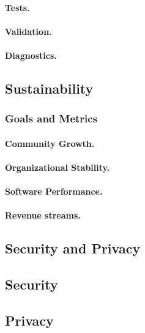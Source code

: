 \documentclass[11pt]{article}
\begin{document}
\paragraph{Tests.}
\paragraph{Validation.}
\paragraph{Diagnostics.}

\subsection{Sustainability}
\subsubsection{Goals and Metrics}
\paragraph{Community Growth.}
\paragraph{Organizational Stability.}
\paragraph{Software Performance.}
\paragraph{Revenue streams.}

\subsection{Security and Privacy}
\subsection{Security}
\subsection{Privacy}

\newpage
\printbibliography
\end{document}
